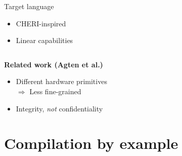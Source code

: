 \documentclass{beamer}
\begin{document}
\begin{frame}
\begin{columns}
\begin{column}{0.45\textwidth}
\begin{block}{Target language}
\begin{itemize}
		\begin{itemize}
		\item CHERI-inspired 
		\item Linear capabilities
		\end{itemize}
	\end{itemize}
	\end{block}
\end{column}
\end{columns}
\vspace{1em}
\textbf{Related work (Agten et al.)} %
\begin{itemize}
\item Different hardware primitives\\%
	$\Rightarrow$ Less fine-grained
\item Integrity, \emph{not} confidentiality

\end{itemize}
\end{frame}

\section{Compilation by example}
\end{document}
